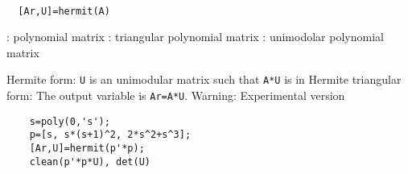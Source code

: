 
\begin{mandesc}
   \\ %
\end{mandesc}
\begin{calling_sequence}
\begin{verbatim}
  [Ar,U]=hermit(A)  
\end{verbatim}
\end{calling_sequence}
\begin{parameters}
  \begin{varlist}
    : polynomial matrix
    : triangular polynomial matrix
    : unimodolar polynomial matrix
  \end{varlist}
\end{parameters}
\begin{mandescription}
  Hermite form: \verb!U! is an unimodular matrix such that \verb!A*U! is
  in Hermite triangular form:
  The output variable is \verb!Ar=A*U!.
  Warning: Experimental version
\end{mandescription}
\begin{examples}
  \begin{Verbatim}
    s=poly(0,'s');
    p=[s, s*(s+1)^2, 2*s^2+s^3];
    [Ar,U]=hermit(p'*p);
    clean(p'*p*U), det(U)
  \end{Verbatim}
\end{examples}
\begin{manseealso}
     
\end{manseealso}

